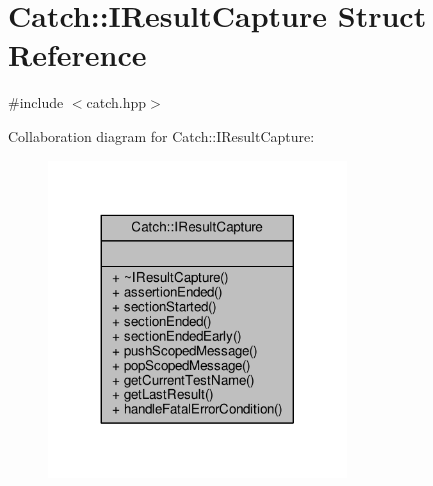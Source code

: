 \hypertarget{struct_catch_1_1_i_result_capture}{\section{Catch\-:\-:I\-Result\-Capture Struct Reference}
\label{struct_catch_1_1_i_result_capture}
}


{\ttfamily \#include $<$catch.\-hpp$>$}



Collaboration diagram for Catch\-:\-:I\-Result\-Capture\-:
\nopagebreak
\begin{figure}[H]
\begin{center}
\leavevmode
\includegraphics[width=224pt]{struct_catch_1_1_i_result_capture__coll__graph}
\end{center}
\end{figure}
